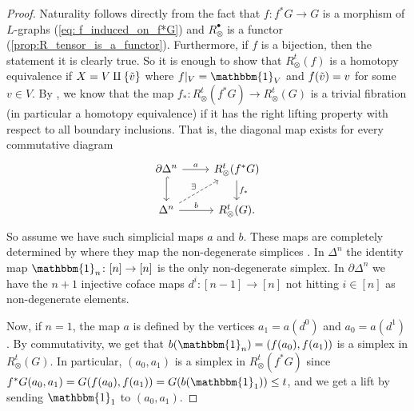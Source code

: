 \documentclass[a4paper,11pt]{article}
\newcommand{\Id}{\mathbbm{1}}
\newcommand{\tensor}{\otimes}
\theoremstyle{remark}
\begin{document}
\begin{proof} Naturality follows directly from the fact that $f:f^*G\to G$ is a morphism of $L$-graphs (\cref{eq: f_induced_on_f*G}) and $R^\bullet_\tensor$ is a functor (\cref{prop:R_tensor_is_a_functor}). Furthermore, if $f$ is a bijection, then the statement it is clearly true. So it is enough to show that $R^t_\tensor(f)$ is a homotopy equivalence if $X=V\amalg\{\Tilde{v}\}$ where $f|_V=\Id_V$ and $f(\Tilde{v})=v$ for some $v\in V$. By \cite[Thm I.11.2]{goerss2009simplicial}, we know that the map $f_*\colon R_\tensor^t(f^*G)\to R_\tensor^t(G)$ is a trivial fibration (in particular a homotopy equivalence) if it has the right lifting property with respect to all boundary inclusions. That is, the diagonal map exists for every commutative diagram
    \begin{equation*}
        \begin{tikzcd}
            \partial\Delta^n\arrow[r,"a"]\arrow[d,hook] & R_\tensor^t(f^*G)\arrow[d,"f_*"]\\
            \Delta^n\arrow[r,"b"]\arrow[ru,dashed,"\exists"] & R_\tensor^t(G).
        \end{tikzcd}
    \end{equation*}
    So assume we have such simplicial maps $a$ and $b$. These maps are completely determined by where they map the non-degenerate simplices \cite[Lemma~on~p.177]{mac2013categories}. In $\Delta^n$ the identity map $\Id_n\colon[n]\to[n]$ is the only non-degenerate simplex. In $\partial\Delta^n$ we have the $n+1$ injective coface maps $d^i\colon [n-1]\to [n]$ not hitting $i\in [n]$ as non-degenerate elements. 
    
    Now, if $n=1$, the map $a$ is defined by the vertices $a_1=a(d^0)$ and $a_0=a(d^1)$. By commutativity, we get that $b(\Id_n)=(f(a_0),f(a_1))$ is a simplex in $R^t_\tensor(G)$. In particular, $(a_0,a_1)$ is a simplex in $R^t_\tensor(f^*G)$ since $f^*G(a_0,a_1)=G(f(a_0),f(a_1))=G(b(\Id_1))\leq t$, and we get a lift by sending $\Id_1$ to $(a_0,a_1)$.


\end{proof}
\end{document}
